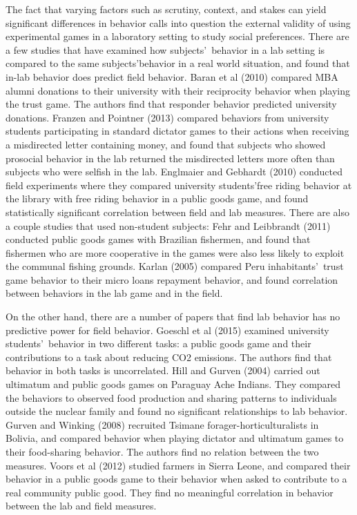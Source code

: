 \documentclass[12pt]{article}
\begin{document}
The fact that varying factors such as scrutiny, context, and stakes can yield significant differences in behavior calls into question the external validity of using experimental games in a laboratory setting to study social preferences. There are a few studies that have examined how subjects\rq \ behavior in a lab setting is compared to the same subjects\rq  behavior in a real world situation, and found that in-lab behavior does predict field behavior. Baran et al (2010) compared MBA alumni donations to their university with their reciprocity behavior when playing the trust game. The authors find that responder behavior predicted university donations. Franzen and Pointner (2013) compared behaviors from university students participating in standard dictator games to their actions when receiving a misdirected letter containing money, and found that subjects who showed prosocial behavior in the lab returned the misdirected letters more often than subjects who were selfish in the lab. Englmaier and Gebhardt (2010) conducted field experiments where they compared university students\rq free riding behavior at the library with free riding behavior in a public goods game, and found statistically significant correlation between field and lab measures. There are also a couple studies that used non-student subjects: Fehr and Leibbrandt (2011) conducted public goods games with Brazilian fishermen, and found that fishermen who are more cooperative in the games were also less likely to exploit the communal fishing grounds. Karlan (2005) compared Peru inhabitants\rq \ trust game behavior to their micro loans repayment behavior, and found correlation between behaviors in the lab game and in the field. 

On the other hand, there are a number of papers that find lab behavior has no predictive power for field behavior. Goeschl et al (2015) examined university students\rq \ behavior in two different tasks: a public goods game and their contributions to a task about reducing CO2 emissions. The authors find that behavior in both tasks is uncorrelated. Hill and Gurven (2004) carried out ultimatum and public goods games on Paraguay Ache Indians. They compared the behaviors to observed food production and sharing patterns to individuals outside the nuclear family and found no significant relationships to lab behavior. Gurven and Winking (2008) recruited Tsimane forager-horticulturalists in Bolivia, and compared behavior when playing dictator and ultimatum games to their food-sharing behavior. The authors find no relation between the two measures. Voors et al (2012) studied farmers in Sierra Leone, and compared their behavior in a public goods game to their behavior when asked to contribute to a real community public good. They find no meaningful correlation in behavior between the lab and field measures. 
\end{document}

